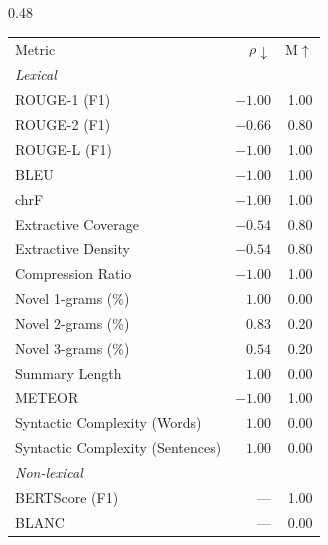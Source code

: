 \begin{table}[htbp]
\centering
\footnotesize
\setlength{\tabcolsep}{4pt}
\begin{subtable}[t]{0.48\textwidth}
\centering
\begin{tabular}{lrr}
 & & \\
\toprule
Metric & $\rho\downarrow$ & M$\uparrow$ \\
\midrule
\multicolumn{3}{l}{\textit{Lexical}} \\
\midrule
\rowcolor{matchTrue} ROUGE-1 (F1)                          &  $-1.00$ &  1.00 \\
\rowcolor{matchTrue} ROUGE-2 (F1)                          &  $-0.66$ &  0.80 \\
\rowcolor{matchTrue} ROUGE-L (F1)                          &  $-1.00$ &  1.00 \\
\rowcolor{matchTrue} BLEU                                  &  $-1.00$ &  1.00 \\
\rowcolor{matchTrue} chrF                                  &  $-1.00$ &  1.00 \\
\rowcolor{matchTrue} Extractive Coverage                   &  $-0.54$ &  0.80 \\
\rowcolor{matchTrue} Extractive Density                    &  $-0.54$ &  0.80 \\
\rowcolor{matchTrue} Compression Ratio                     &  $-1.00$ &  1.00 \\
\rowcolor{matchFalse} Novel 1-grams (\%)                    &   $1.00$ &  0.00 \\
\rowcolor{matchFalse} Novel 2-grams (\%)                    &   $0.83$ &  0.20 \\
\rowcolor{matchFalse} Novel 3-grams (\%)                    &   $0.54$ &  0.20 \\
\rowcolor{matchFalse} Summary Length                        &   $1.00$ &  0.00 \\
\rowcolor{matchTrue} METEOR                                &  $-1.00$ &  1.00 \\
\rowcolor{matchFalse} Syntactic Complexity (Words)          &   $1.00$ &  0.00 \\
\rowcolor{matchFalse} Syntactic Complexity (Sentences)      &   $1.00$ &  0.00 \\
\midrule
\multicolumn{3}{l}{\textit{Non-lexical}} \\
\midrule
\rowcolor{matchFalse} BERTScore (F1)                        &      --- &  1.00 \\
\rowcolor{matchFalse} BLANC                                 &      --- &  0.00 \\

\end{tabular}
\end{subtable}
\end{table}
